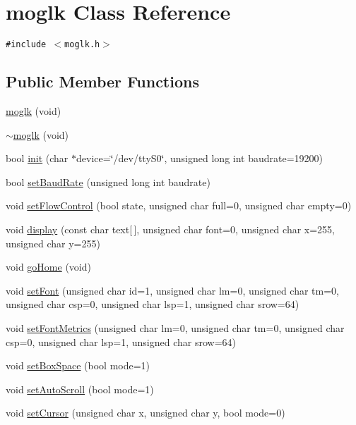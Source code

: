 \hypertarget{classmoglk}{
\section{moglk Class Reference}
\label{classmoglk}
}
{\tt \#include $<$moglk.h$>$}

\subsection*{Public Member Functions}
\begin{CompactItemize}
\item 
\hyperlink{classmoglk_3f753134676c7d36a96e6d4439cc0348}{moglk} (void)
\item 
\hyperlink{classmoglk_19ba0cf0910a364b32685b1806a98773}{$\sim$moglk} (void)
\item 
bool \hyperlink{classmoglk_2b26bc8f68f3b4efcac9d1e6d902b695}{init} (char $\ast$device=\char`\"{}/dev/ttyS0\char`\"{}, unsigned long int baudrate=19200)
\item 
bool \hyperlink{classmoglk_788fca7601af41bd23d2f310ecc34100}{setBaudRate} (unsigned long int baudrate)
\item 
void \hyperlink{classmoglk_09137664a708707066b2705b3a6d6894}{setFlowControl} (bool state, unsigned char full=0, unsigned char empty=0)
\item 
void \hyperlink{classmoglk_cf30cd08a2e1434e68b386236f4060bd}{display} (const char text\mbox{[}$\,$\mbox{]}, unsigned char font=0, unsigned char x=255, unsigned char y=255)
\item 
void \hyperlink{classmoglk_1f33a99d62509dfd98ca6898ba5a228e}{goHome} (void)
\item 
void \hyperlink{classmoglk_cfb8813e8db8de6ef0f34e479952589b}{setFont} (unsigned char id=1, unsigned char lm=0, unsigned char tm=0, unsigned char csp=0, unsigned char lsp=1, unsigned char srow=64)
\item 
void \hyperlink{classmoglk_17c4f023df63951df9f19f08c56f8786}{setFontMetrics} (unsigned char lm=0, unsigned char tm=0, unsigned char csp=0, unsigned char lsp=1, unsigned char srow=64)
\item 
void \hyperlink{classmoglk_ad564fea38cd80622152c152bfe62f4e}{setBoxSpace} (bool mode=1)
\item 
void \hyperlink{classmoglk_38e9c9bda5fbe192d696ae67246c0bef}{setAutoScroll} (bool mode=1)
\item 
void \hyperlink{classmoglk_15e0fbeefcab8874138e8865c53e204c}{setCursor} (unsigned char x, unsigned char y, bool mode=0)

\end{CompactItemize}
